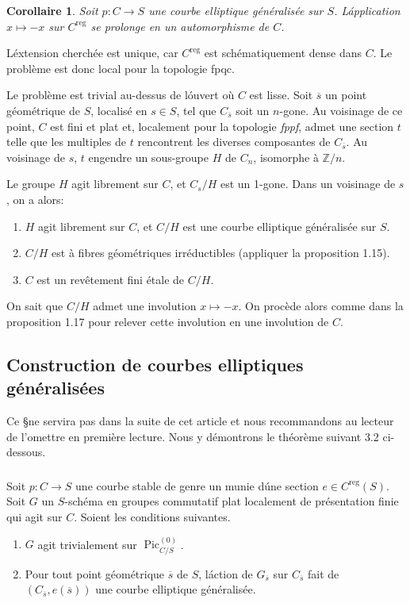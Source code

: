 \documentclass{amsart}
\theoremstyle{plain}
\newtheorem{corollary}[theorem]{Corollaire}
\theoremstyle{remark}
\DeclareMathOperator{\Pic}{Pic}
\newcommand{\bbZ}{\mathbb{Z}}
\begin{document}
\begin{corollary}
Soit $p: C \to S$ une courbe elliptique g\'en\'eralis\'ee sur $S$. L\'application
$x \mapsto -x$ sur $C^{\mathrm{reg}}$ se prolonge en un automorphisme de $C$.
\end{corollary}

L\'extension cherch\'ee est unique, car $C^{\mathrm{reg}}$ est sch\'ematiquement dense dans $C$.
Le probl\`eme est donc local pour la topologie fpqc.

Le probl\`eme est trivial au-dessus de l\'ouvert o\`u $C$ est lisse. Soit $\overline{s}$
un point g\'eom\'etrique de $S$, localis\'e en $s \in S$, tel que $C_{\overline{s}}$
soit un $n$-gone. Au voisinage de ce point, $C$ est fini et plat et, localement pour la
topologie \emph{fppf}, admet une section $t$ telle que les multiples de $t$ rencontrent
les diverses composantes de $C_{\overline{s}}$. Au voisinage de $s$, $t$ engendre un
sous-groupe $H$ de $C_n$, isomorphe \`a $\bbZ/n$.

Le groupe $H$ agit librement sur $C$, et $C_s/H$ est un 1-gone. Dans un voisinage de
$s$, on a alors:
\begin{enumerate}
\item[(a)] $H$ agit librement sur $C$, et $C/H$ est une courbe elliptique
g\'en\'eralis\'ee sur $S$.
\item[(b)] $C/H$ est \`a fibres g\'eom\'etriques irr\'eductibles (appliquer la
proposition 1.15).
\item[(c)] $C$ est un rev\^etement fini \'etale de $C/H$.
\end{enumerate}

On sait que $C/H$ admet une involution $x \mapsto -x$. On proc\`ede alors comme dans la
proposition 1.17 pour relever cette involution en une involution de $C$.

\subsection{Construction de courbes elliptiques g\'en\'eralis\'ees}

Ce \S ne servira pas dans la suite de cet article et nous recommandons au lecteur de
l'omettre en premi\`ere lecture. Nous y d\'emontrons le th\'eor\`eme suivant 3.2 ci-dessous.

\subsubsection{}
Soit $p: C \to S$ une courbe stable de genre un munie d\'une section $e \in C^{\mathrm{reg}}(S)$.
Soit $G$ un $S$-sch\'ema en groupes commutatif plat localement de pr\'esentation finie qui
agit sur $C$. Soient les conditions suivantes.
\begin{enumerate}
\item[(1)] $G$ agit trivialement sur $\Pic^{(0)}_{C/S}$.
\item[(2)] Pour tout point g\'eom\'etrique $\overline{s}$ de $S$, l\'action de
$G_{\overline{s}}$ sur $C_{\overline{s}}$ fait de $(C_{\overline{s}}, e(\overline{s}))$ une
courbe elliptique g\'en\'eralis\'ee.
\end{enumerate}
\end{document}

